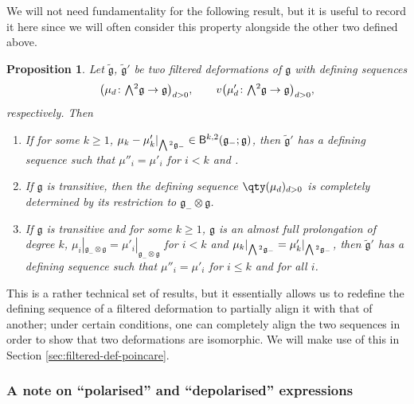 \documentclass[10pt,a4paper]{amsart}
\numberwithin{equation}{section}
\newtheorem{Proposition}[Theorem]{Proposition}
 { \theoremstyle{definition}
\newtheorem{Definition}[Theorem]{Definition}
\newtheorem{Note}[Theorem]{Note}
\newtheorem{Example}[Theorem]{Example}
\newtheorem{Remark}[Theorem]{Remark} }
\newcommand{\fg}{\mathfrak{g}}
\newcommand{\ssB}{\mathsf{B}}
\newcommand{\fgtilde}{\widetilde{\mathfrak{g}}}
\newcommand{\Wedge}{\mathchoice{{\textstyle\bigwedge}}{\bigwedge}{\bigwedge}{\bigwedge}}	%
\newcommand{\1}{\mathbbm{1}}
\begin{document}
We will not need fundamentality for the following result, but it is useful to record it here since we will often consider this property alongside the other two defined above.

\begin{Proposition}\label{prop:def-seq-redef}
	Let $\fgtilde$, $\fgtilde'$ be two filtered deformations of $\fg$ with defining sequences
\[
\bigl(\mu_d\colon\Wedge^2\fg\to\fg\bigr)_{d> 0}, \qquad v\bigl(\mu'_d\colon\Wedge^2\fg\to\fg\bigr)_{d> 0},
\]
 respectively. Then
	\begin{enumerate}\itemsep=0pt
		\item[$(1)$] {\rm\cite[\emph{Proposition}~2.3]{Cheng1998}} If for some $k\geq 1$, $\mu_k-\mu_k'|_{\Wedge^2\fg_-}\in\ssB^{k,2}(\fg_-;\fg)$, then $\fgtilde'$ has a defining sequence  such that $\mu''_i=\mu'_i$ for $i<k$ and \smash{$\mu''_k|_{\Wedge^2\fg_-}=\mu_k|_{\Wedge^2\fg_-}$}.
			\label{item:def-seq-redef-1}
		\item[$(2)$] {\rm\cite[\emph{Proposition}~2.5]{Cheng1998}} If $\fg$ is transitive, then the defining sequence $\qty(\mu_d)_{d> 0}$ is completely determined by its restriction to $\fg_-\otimes\fg$.
			\label{item:def-seq-redef-2}
		\item[$(3)$] {\rm\cite[\emph{Proposition}~2.6]{Cheng1998}} If $\fg$ is transitive and for some $k\geq 1$, $\fg$ is an almost full prolongation of degree $k$, $\mu_i|_{\fg_-\otimes\fg}=\mu'_i|_{\fg_-\otimes\fg}$ for $i<k$ and $\mu_k|_{\Wedge^2\fg_-}=\mu'_k|_{\Wedge^2\fg_-}$, then $\fgtilde'$ has a defining sequence  such that $\mu''_i=\mu'_i$ for $i\leq k$ and \smash{$\mu''_i|_{\Wedge^2\fg_-}=\mu_i'|_{\Wedge^2\fg_-}$} for all $i$.
			\label{item:def-seq-redef-3}
	\end{enumerate}
\end{Proposition}

This is a rather technical set of results, but it essentially allows us to redefine the defining sequence of a filtered deformation to partially align it with that of another; under certain conditions, one can completely align the two sequences in order to show that two deformations are isomorphic. We will make use of this in Section \ref{sec:filtered-def-poincare}.

\subsubsection{A note on ``polarised'' and ``depolarised'' expressions}
\label{sec:polarisation}
\end{document}
